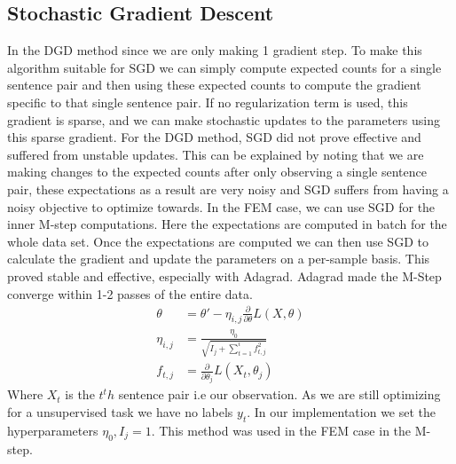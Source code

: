 \documentclass[11pt,letterpaper]{article}
\begin{document}
\subsection*{Stochastic Gradient Descent}
In the DGD method since we are only making 1 gradient step. To make this algorithm suitable for SGD we can simply compute expected counts for a single sentence pair and then using these expected counts to compute the gradient specific to that single sentence pair. If no regularization term is used, this gradient is sparse, and we can make stochastic updates to the parameters using this sparse gradient. For the DGD method, SGD did not prove effective and suffered from unstable updates. This can be explained by noting that we are making changes to the expected counts after only observing a single sentence pair, these expectations as a result are very noisy and SGD suffers from having a noisy objective to optimize towards. In the FEM case, we can use SGD for the inner M-step computations. Here the expectations are computed in batch for the whole data set. Once the expectations are computed we can then use SGD to calculate the gradient and update the parameters on a per-sample basis. This proved stable and effective, especially with Adagrad. Adagrad made the M-Step converge within 1-2 passes of the entire data.
\begin{align*}
\theta &= \theta' - \eta_{i,j}\frac{\partial}{\partial \theta} L(X,\theta)\\  
\eta_{i,j} &= \frac{\eta_0}{\sqrt{I_j + \sum_{t=1}^i f_{t,j}^2}}\\
f_{t,j} &= \frac{\partial}{\partial \theta_j} L(X_t,\theta_j)
\end{align*}
Where $X_t$ is the $t^th$ sentence pair i.e our observation. As we are still optimizing for a unsupervised task we have no labels $y_t$. In our implementation we set the hyperparameters $\eta_0, I_j = 1$. This method was used in the FEM case in the M-step.
\end{document}
